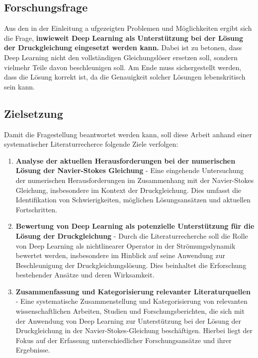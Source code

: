 \subsection{Forschungsfrage}
Aus den in der Einleitung a
ufgezeigten Problemen und Möglichkeiten ergibt sich die Frage, \textbf{inwieweit Deep Learning als Unterstützung bei der Lösung der Druckgleichung eingesetzt werden kann.} Dabei ist zu betonen, dass Deep Learning nicht den vollständigen Gleichungslöser ersetzen soll, sondern vielmehr Teile davon beschleunigen soll. Am Ende muss sichergestellt werden, dass die Lösung korrekt ist, da die Genauigkeit solcher Lösungen lebenskritisch sein kann.

\subsection{Zielsetzung}
Damit die Fragestellung beantwortet werden kann, soll diese Arbeit anhand einer systematischer Literaturrecherce folgende Ziele verfolgen:

\begin{enumerate}
    \item \textbf{Analyse der aktuellen Herausforderungen bei der numerischen Lösung der Navier-Stokes Gleichung} - Eine eingehende Untersuchung der numerischen Herausforderungen im Zusammenhang mit der Navier-Stokes Gleichung, insbesondere im Kontext der Druckgleichung. Dies umfasst die Identifikation von Schwierigkeiten, möglichen Lösungsansätzen und aktuellen Fortschritten.
    \item \textbf{Bewertung von Deep Learning als potenzielle Unterstützung für die Lösung der Druckgleichung} - Durch die Literaturrecherche soll die Rolle von Deep Learning als nichtlinearer Operator in der Strömungsdynamik bewertet werden, insbesondere im Hinblick auf seine Anwendung zur Beschleunigung der Druckgleichungslösung. Dies beinhaltet die Erforschung bestehender Ansätze und deren Wirksamkeit.
    \item \textbf{Zusammenfassung und Kategorisierung relevanter Literaturquellen} - Eine systematische Zusammenstellung und Kategorisierung von relevanten wissenschaftlichen Arbeiten, Studien und Forschungsberichten, die sich mit der Anwendung von Deep Learning zur Unterstützung bei der Lösung der Druckgleichung in der Navier-Stokes-Gleichung beschäftigen. Hierbei liegt der Fokus auf der Erfassung unterschiedlicher Forschungsansätze und ihrer Ergebnisse.
\end{enumerate}
